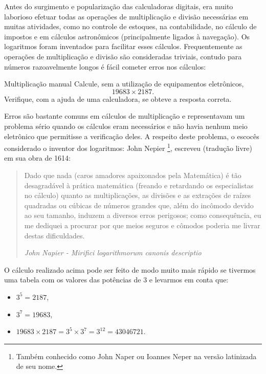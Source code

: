 
Antes do surgimento e popularização das calculadoras digitais, era muito laborioso efetuar todas as operações de multiplicação e divisão necessárias em muitas atividades, como no controle de estoques, na contabilidade, no cálculo de impostos e em cálculos astronômicos (principalmente ligados à navegação). Os logaritmos foram inventados para facilitar esses cálculos. Frequentemente as operações de multiplicação e divisão são consideradas triviais, 
contudo para números razoavelmente longos é fácil cometer erros nos cálculos:

\begin{task}{Multiplicação manual}
Calcule, sem a utilização de equipamentos eletrônicos,
$$
19683 \times 2187.
$$
Verifique, com a ajuda de uma calculadora, se obteve a resposta correta.
\end{task}

Erros são bastante comuns em cálculos de multiplicação e representavam um problema sério quando os cálculos eram necessários e 
não havia nenhum 
meio eletrônico que permitisse a verificação deles. A respeito deste problema, o escocês considerado o inventor dos 
logaritmos: John Nepier \footnote{Também conhecido como John Naper ou  Ioannes Neper na versão latinizada de seu 
nome.}, 
escreveu (tradução livre) em sua obra de 1614:
\begin{quote}
Dado que nada (caros amadores apaixonados pela Matemática) é tão desagradável à prática matemática 
(freando e retardando os especialistas no cálculo) quanto as multiplicações, as divisões e as extrações de raízes 
quadradas ou cúbicas de números grandes que, além do incômodo devido ao seu tamanho, induzem a diversos erros 
perigosos; 
como consequência, eu me dediquei a procurar por que meios seguros e cômodos poderia me livrar destas 
dificuldades.

\raggedleft \textit{John Napier - Mirifici logarithmorum canonis descriptio} 
\end{quote}

O cálculo realizado acima pode ser feito de modo muito mais rápido se tivermos uma tabela com os valores das potências de $3$ e levarmos em conta que:
\begin{itemize}
 \item $3^5=2187$,
  \item $3^7=19683$,
   \item $19683 \times 2187 = 3^5 \times 3^7 = 3^{12} = 43046721$.
\end{itemize}


